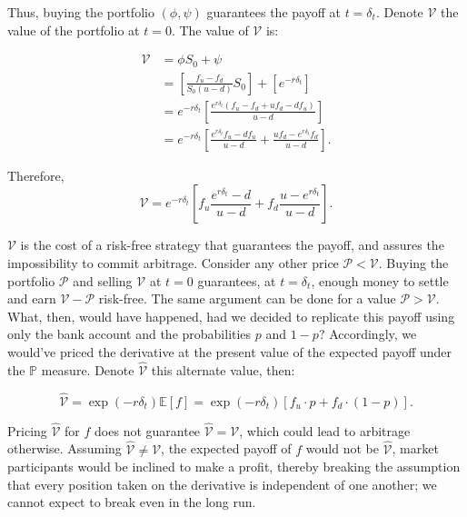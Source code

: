 \documentclass[../TGMAFFIRO.tex]{subfiles}
\begin{document}
Thus, buying the portfolio $(\phi, \psi)$ guarantees the payoff at $t=\delta_t$. Denote $\mathcal{V}$ the value of the portfolio at $t=0$. The value of $\mathcal{V}$ is:

\begin{align*}
    \mathcal{V} &= \phi S_0 + \psi\\
                &= \left[\frac{f_u - f_d}{S_0(u - d)}S_0\right] + \left[e^{-r\delta_t}\right]\\
                &= e^{-r\delta_t}\left[\frac{e^{r\delta_t}(f_u - f_d + uf_d - df_u)}{u - d}\right]\\
                &= e^{-r\delta_t}\left[\frac{e^{r\delta_t}f_u - df_u}{u-d} + \frac{uf_d - e^{r\delta_t}f_d}{u-d}\right].
\end{align*}

Therefore,
\begin{equation} \label{eq:v_price_complete}
	\mathcal{V} = e^{-r\delta_t}\left[f_u \frac{e^{r\delta_t} - d}{u - d} + f_d \frac{u - e^{r\delta_t}}{u-d}\right].
\end{equation}

$\mathcal{V}$ is the cost of a risk-free strategy that guarantees the payoff, and assures the impossibility to commit arbitrage. Consider any other price $\mathcal{P} < \mathcal{V}$. Buying the portfolio $\mathcal{P}$ and selling $\mathcal{V}$ at $t=0$ guarantees, at $t=\delta_t$, enough money to settle and earn $\mathcal{V}-\mathcal{P}$ risk-free. The same argument can be done for a value $\mathcal{P} > \mathcal{V}$.\\

What, then, would have happened, had we decided to replicate this payoff using only the bank account and the probabilities $p$ and $1-p$? Accordingly, we would've priced the derivative at the present value of the expected payoff under the $\mathbb{P}$ measure. Denote $\hat{\mathcal{V}}$ this alternate value, then:

\begin{equation}
    \hat{\mathcal{V}} = \exp(-r\delta_t)\mathbb{E}[f] = \exp(-r\delta_t)[f_u \cdot p + f_d \cdot (1- p) ].
\end{equation}


Pricing $\hat{\mathcal{V}}$ for $f$ does not guarantee $\hat{\mathcal{V}} = \mathcal{V}$, which could lead to arbitrage otherwise. Assuming $\hat{\mathcal{V}} \neq \mathcal{V}$, the expected payoff of $f$ would not be $\hat{\mathcal{V}}$, market participants would be inclined to make a profit, thereby breaking the assumption that every position taken on the derivative is independent of one another; we cannot expect to break even in the long run.
\end{document}
